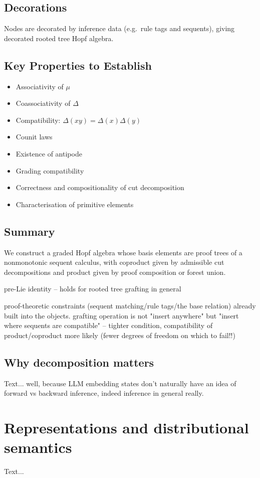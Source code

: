 \documentclass[a4paper,11pt]{report}
\begin{document}
\subsection*{Decorations}
Nodes are decorated by inference data (e.g.\ rule tags and sequents), giving decorated rooted tree Hopf algebra.

\subsection*{Key Properties to Establish}
\begin{itemize}
\item Associativity of $\mu$
\item Coassociativity of $\Delta$
\item Compatibility: $\Delta(xy) = \Delta(x)\Delta(y)$
\item Counit laws
\item Existence of antipode
\item Grading compatibility
\item Correctness and compositionality of cut decomposition
\item Characterisation of primitive elements
\end{itemize}

\subsection*{Summary}
We construct a graded Hopf algebra whose basis elements are proof trees of a nonmonotonic sequent calculus, with coproduct given by admissible cut decompositions and product given by proof composition or forest union.

pre-Lie identity -- holds for rooted tree grafting in general

 proof-theoretic constraints (sequent matching/rule tags/the base relation) already built into the objects.  grafting operation is not "insert anywhere" but "insert where sequents are compatible" --  tighter condition, compatibility of product/coproduct more likely (fewer degrees of freedom on which to fail!!)

\subsection{Why decomposition matters}
Text...
well, because LLM embedding states don't naturally have an idea of forward vs backward inference, indeed inference in general really.
\section{Representations and distributional semantics}
Text...
\end{document}
